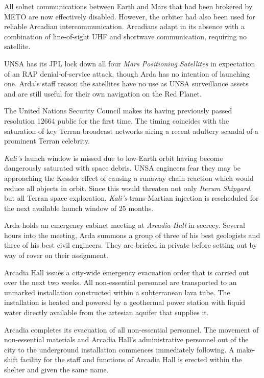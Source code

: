 All solnet communications between Earth and Mars that had been brokered by METO are now effectively disabled. However, the orbiter had also been used for reliable Arcadian intercommunication. Arcadians adapt in its absence with a combination of line-of-sight UHF and shortwave communication, requiring no satellite.

UNSA has its JPL lock down all four {\it Mars Positioning Satellites} in expectation of an RAP denial-of-service attack, though Arda has no intention of launching one. Arda's staff reason the satellites have no use as UNSA surveillance assets and are still useful for their own navigation on the Red Planet.
\StopTimelineDate

The United Nations Security Council makes its having previously passed resolution 12664 public for the first time. The timing coincides with the saturation of key Terran broadcast networks airing a recent adultery scandal of a prominent Terran celebrity.
\StopTimelineDate

{\it Kali's} launch window is missed due to low-Earth orbit having become dangerously saturated with space debris. UNSA engineers fear they may be approaching the Kessler effect of causing a runaway chain reaction which would reduce all objects in orbit. Since this would threaten not only {\it Iterum Shipyard}, but all Terran space exploration, {\it Kali's} trans-Martian injection is rescheduled for the next available launch window of 25 months.
\StopTimelineDate

Arda holds an emergency cabinet meeting at {\it Arcadia Hall} in secrecy. Several hours into the meeting, Arda summons a group of three of his best geologists and three of his best civil engineers. They are briefed in private before setting out by way of rover on their assignment.
\StopTimelineDate

Arcadia Hall issues a city-wide emergency evacuation order that is carried out over the next two weeks. All non-essential personnel are transported to an unmarked installation constructed within a subterranean lava tube. The installation is heated and powered by a geothermal power station with liquid water directly available from the artesian aquifer that supplies it.
\StopTimelineDate

Arcadia completes its evacuation of all non-essential personnel. The movement of non-essential materials and Arcadia Hall's administrative personnel out of the city to the underground installation commences immediately following. A make-shift facility for the staff and functions of Arcadia Hall is erected within the shelter and given the same name.

